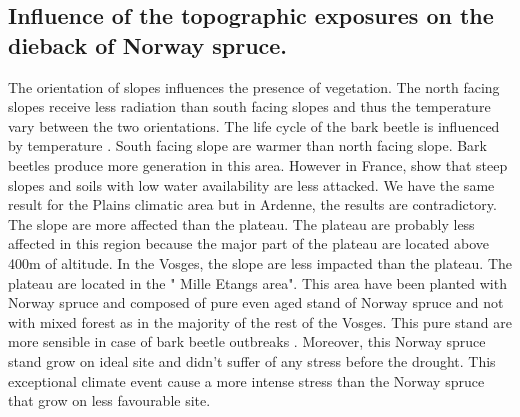 \documentclass[3p,procedia]{elsarticle}
\begin{document}
	


\subsection{Influence of the topographic exposures on the dieback of Norway spruce.}


The orientation of slopes influences the presence of vegetation. The north facing slopes receive less radiation than south facing slopes and thus the temperature vary between the two orientations.
The life cycle of the bark beetle is influenced by temperature \citep{baier_phenipscomprehensive_2007}. 
South facing slope are warmer than north facing slope.
Bark beetles produce more generation in this area. 
However in France, \cite{nardi_drought_2022} show that steep slopes and soils with low water availability are less attacked.
We have the same result for the Plains climatic area but in Ardenne, the results are contradictory. The slope are more affected than the plateau. The plateau are probably less affected in this region because the major part of the plateau are located above 400m of altitude.
In the Vosges, the slope are less impacted than the plateau. 
The plateau are located in the " Mille Etangs area". This area have been planted with Norway spruce and composed of pure even aged stand of Norway spruce and not with mixed forest as in the majority of the rest of the Vosges.
This pure stand are more sensible in case of bark beetle outbreaks \citep{jactel_2021}.
Moreover, this Norway spruce stand grow on ideal site and didn't suffer of any stress
before the drought. 
This exceptional climate event cause a more intense stress than the Norway spruce that grow on less favourable site.
\end{document}
